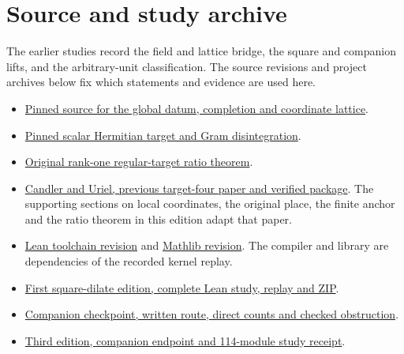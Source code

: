 \documentclass[12pt,letterpaper]{article}
\begin{document}
\section*{Source and study archive}
\begingroup\small
The earlier studies record the field and lattice bridge, the square and companion lifts, and the arbitrary-unit classification. The source revisions and project archives below fix which statements and evidence are used here.
\begin{itemize}
\item \href{https://github.com/nousentllc/riemann-hypothesis/blob/40e56bab026552e089d7afcfeff08d2defb9c005/src/Formalism/SharpRestriction/GlobalSchurBounds/GeneralLinearActions/GenusMassVolumes.lean}{Pinned source for the global datum, completion and coordinate lattice}.
\item \href{https://github.com/nousentllc/riemann-hypothesis/blob/40e56bab026552e089d7afcfeff08d2defb9c005/src/CompanionTheory/SpectralGeometry/CountingDefinitions/AdelicEulerProducts/IsEulerProd.lean}{Pinned scalar Hermitian target and Gram disintegration}.
\item \href{https://github.com/nousentllc/riemann-hypothesis/blob/40e56bab026552e089d7afcfeff08d2defb9c005/src/CompanionTheory/SpectralGeometry/LocalGlobalProofs/AdelicAnalysis/LocalGramFiberRankOneSetFormula.lean#L310}{Original rank-one regular-target ratio theorem}.
\item \href{https://github.com/nousentllc/riemann-hypothesis/tree/63c06fe44eb700e4550e4a2b70adafe09cb1ff9b/research/uriel/experiments/ramified-gram-bridge}{Candler and Uriel, previous target-four paper and verified package}. The supporting sections on local coordinates, the original place, the finite anchor and the ratio theorem in this edition adapt that paper.
\item \href{https://github.com/leanprover/lean4/commit/819816b2e0a3bf405af45ae5c7af2491d8f5bee6}{Lean toolchain revision} and \href{https://github.com/leanprover-community/mathlib4/commit/0df444a360eaa60ab8c11dca51a86af692955474}{Mathlib revision}. The compiler and library are dependencies of the recorded kernel replay.
\item \href{https://github.com/nousentllc/riemann-hypothesis/tree/17263859a4d27c62cfc67571737355f61a080806/research/uriel/experiments/ramified-square-dilates}{First square-dilate edition, complete Lean study, replay and ZIP}.
\item \href{https://github.com/nousentllc/riemann-hypothesis/tree/459a04431bbcc912c212b64fcc298b6a07774506/research/uriel/portfolio/ramified-companion}{Companion checkpoint, written route, direct counts and checked obstruction}.
\item \href{https://github.com/nousentllc/riemann-hypothesis/tree/1747b933087347e26863fbcb3dbb82debd0441e0/research/uriel/experiments/ramified-companion-lean}{Third edition, companion endpoint and 114-module study receipt}.
\end{itemize}
\endgroup
\end{document}
